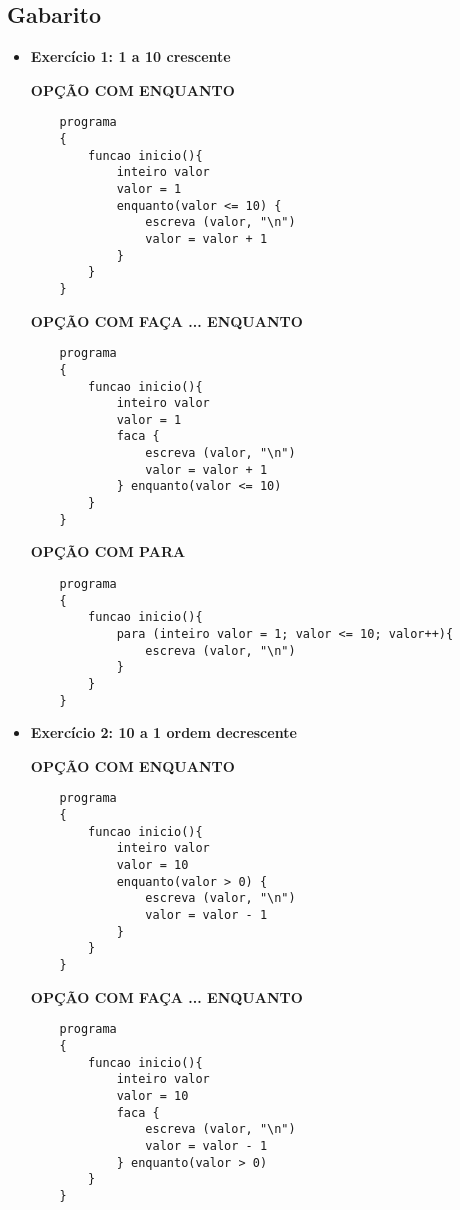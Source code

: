 \documentclass{article}
\begin{document}
\subsection*{Gabarito}
\begin{itemize}
    \item \textbf{Exercício 1: 1 a 10 crescente}
    
    \textbf{OPÇÃO COM ENQUANTO}
    \begin{lstlisting}
    programa
    {
        funcao inicio(){
            inteiro valor
            valor = 1
            enquanto(valor <= 10) {
                escreva (valor, "\n")
                valor = valor + 1
            }
        }
    }
    \end{lstlisting}

    \textbf{OPÇÃO COM FAÇA ... ENQUANTO}
    \begin{lstlisting}
    programa
    {
        funcao inicio(){
            inteiro valor
            valor = 1
            faca {
                escreva (valor, "\n")
                valor = valor + 1
            } enquanto(valor <= 10)
        }
    }
    \end{lstlisting}

    \textbf{OPÇÃO COM PARA}
    \begin{lstlisting}
    programa
    {
        funcao inicio(){
            para (inteiro valor = 1; valor <= 10; valor++){
                escreva (valor, "\n")
            }
        }
    }
    \end{lstlisting}

    \item \textbf{Exercício 2: 10 a 1 ordem decrescente}
    
    \textbf{OPÇÃO COM ENQUANTO}
    \begin{lstlisting}
    programa
    {
        funcao inicio(){
            inteiro valor
            valor = 10
            enquanto(valor > 0) {
                escreva (valor, "\n")
                valor = valor - 1
            }
        }
    }
    \end{lstlisting}

    \textbf{OPÇÃO COM FAÇA ... ENQUANTO}
    \begin{lstlisting}
    programa
    {
        funcao inicio(){
            inteiro valor
            valor = 10
            faca {
                escreva (valor, "\n")
                valor = valor - 1
            } enquanto(valor > 0)
        }
    }
    \end{lstlisting}


\end{itemize}
\end{document}
